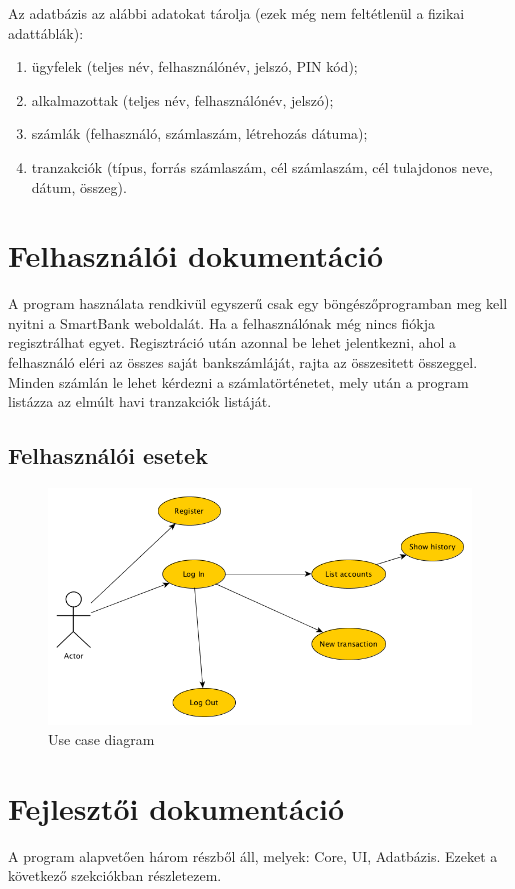 \documentclass{article}
\begin{document}
\par Az adatbázis az alábbi adatokat tárolja (ezek még nem feltétlenül a fizikai adattáblák):
\begin{enumerate}
	\item ügyfelek (teljes név, felhasználónév, jelszó, PIN kód);
	\item alkalmazottak (teljes név, felhasználónév, jelszó);
	\item számlák (felhasználó, számlaszám, létrehozás dátuma);
	\item tranzakciók (típus, forrás számlaszám, cél számlaszám, cél tulajdonos neve, dátum, összeg).
\end{enumerate}
\section{Felhasználói dokumentáció}
A program használata rendkivül egyszerű csak egy böngészőprogramban meg kell nyitni a SmartBank weboldalát. Ha a felhasználónak még nincs fiókja regisztrálhat egyet. Regisztráció után azonnal be lehet jelentkezni, ahol a felhasználó eléri az összes saját bankszámláját, rajta az összesitett összeggel. Minden számlán le lehet kérdezni a számlatörténetet, mely után a program listázza az elmúlt havi tranzakciók listáját.  	
\subsection{Felhasználói esetek}
\begin{figure}[h]
	\caption{Use case diagram}
	\includegraphics[scale=0.5]{usecase}
\end{figure}
\section{Fejlesztői dokumentáció}
A program alapvetően három részből áll, melyek: Core, UI, Adatbázis. Ezeket a következő szekciókban részletezem.
\end{document}
